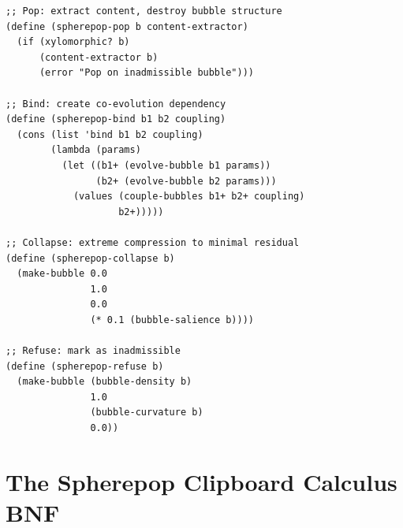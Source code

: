 \documentclass[12pt,oneside]{book}
\theoremstyle{plain}
\theoremstyle{definition}
\theoremstyle{plain}
\begin{document}
\begin{lstlisting}
;; Pop: extract content, destroy bubble structure
(define (spherepop-pop b content-extractor)
  (if (xylomorphic? b)
      (content-extractor b)
      (error "Pop on inadmissible bubble")))

;; Bind: create co-evolution dependency
(define (spherepop-bind b1 b2 coupling)
  (cons (list 'bind b1 b2 coupling)
        (lambda (params)
          (let ((b1+ (evolve-bubble b1 params))
                (b2+ (evolve-bubble b2 params)))
            (values (couple-bubbles b1+ b2+ coupling)
                    b2+)))))

;; Collapse: extreme compression to minimal residual
(define (spherepop-collapse b)
  (make-bubble 0.0
               1.0
               0.0
               (* 0.1 (bubble-salience b))))

;; Refuse: mark as inadmissible
(define (spherepop-refuse b)
  (make-bubble (bubble-density b)
               1.0
               (bubble-curvature b)
               0.0))
\end{lstlisting}

\chapter{The Spherepop Clipboard Calculus BNF}
\label{app:spherepop_bnf}
\end{document}
